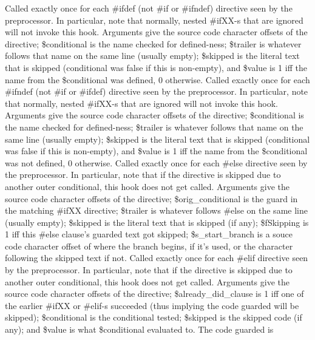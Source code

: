 Called exactly once for each \#ifdef
(not \#if or \#ifndef) directive seen by the preprocessor. In particular,
note that normally, nested \#ifXX-s that are ignored will not invoke this hook.
Arguments give the source code character
offsets of the directive; \$conditional is the name checked for defined-ness;
\$trailer is whatever follows that name on the same line (usually empty); \$skipped is
the literal text that is skipped (conditional was false if this is non-empty), and
\$value is 1 iff the name from the \$conditional was defined, 0 otherwise.
Called exactly once for each \#ifndef
(not \#if or \#ifdef) directive seen by the preprocessor. In particular,
note that normally, nested \#ifXX-s that are ignored will not invoke this hook.
Arguments give the source code character
offsets of the directive; \$conditional is the name checked for defined-ness;
\$trailer is whatever follows that name on the same line (usually empty); \$skipped is
the literal text that is skipped (conditional was false if this is non-empty), and
\$value is 1 iff the name from the \$conditional was not defined, 0 otherwise.
Called exactly once for each \#else directive seen by the preprocessor. In particular,
note that if the directive is skipped due to another outer conditional, this
hook does not get called.
Arguments give the source code character
offsets of the directive; \$orig\_\-conditional is the guard in the
matching \#ifXX directive; 
\$trailer is whatever follows \#else on the same line (usually empty); \$skipped is
the literal text that is skipped (if any); \$fSkipping is 1 iff
this \#else clause's guarded text got skipped; \$s\_\-start\_\-branch is a souce code
character offset of where the branch begins, if it's used, or the character
following the skipped text if not.
Called exactly once for each \#elif directive seen by the preprocessor. In particular,
note that if the directive is skipped due to another outer conditional, this
hook does not get called.
Arguments give the source code character
offsets of the directive; \$already\_\-did\_\-clause is 1 iff one of the
earlier \#ifXX or \#elif-s succeeded (thus implying the code guarded will be skipped);
\$conditional is the conditional tested; \$skipped is the skipped code (if any);
and \$value is what \$conditional evaluated to.  The code guarded is
